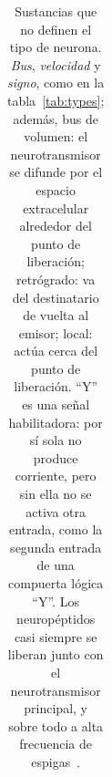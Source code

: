 \begin{table}[t]
\begin{tabular}{>{\raggedright}p{2.25cm}>{\raggedright}p{2.8cm}>{\raggedright}p{1.8cm}>{\raggedright}p{1.5cm}>{\centering}p{0.8cm}>{\raggedright\arraybackslash}p{4.3cm}}
\bottomrule
\end{tabular}
\caption{Sustancias que no definen el tipo de neurona. \emph{Bus}, \emph{velocidad} y \emph{signo}, como en la tabla~\ref{tab:types}; además, bus de volumen: el neurotransmisor se difunde por el espacio extracelular alrededor del punto de liberación; retrógrado: va del destinatario de vuelta al emisor; local: actúa cerca del punto de liberación. “Y” es una señal habilitadora: por sí sola no produce corriente, pero sin ella no se activa otra entrada, como la segunda entrada de una compuerta lógica “Y”. Los neuropéptidos casi siempre se liberan junto con el neurotransmisor principal, y sobre todo a alta frecuencia de espigas~\cite{vandenPol2012}.}
\label{tab:othermediators}
\end{table}
